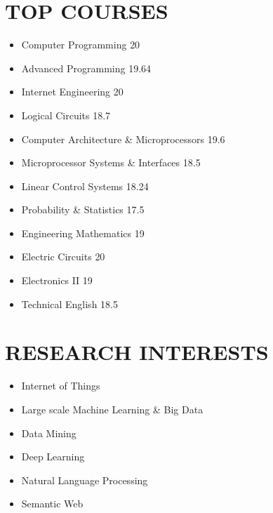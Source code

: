 \documentclass[10pt,a4paper,sans]{moderncv} %
\begin{document}
\section{TOP COURSES}

\begin{multicols}{2} 

	\begin{itemize}
	
		\item Computer Programming               		\hfill{20}  
		\item Advanced Programming                    \hfill{19.64}
		\item Internet Engineering						\hfill{20}
		\item Logical Circuits                         \hfill{18.7}
		\item Computer Architecture \& Microprocessors \hfill{19.6}
		\item Microprocessor Systems \& Interfaces		\hfill{18.5}
		\item Linear Control Systems                   \hfill{18.24}
		\item Probability \& Statistics				\hfill{17.5}  
		\item Engineering Mathematics               \hfill{19}
		\item Electric Circuits                       	  		\hfill{20}   
		\item Electronics II                              		\hfill{19} 
		\item Technical English                               \hfill{18.5}
	
	\end{itemize}

\end{multicols}

\section{RESEARCH INTERESTS}
\begin{itemize}
	\item Internet of Things
	\item Large scale Machine Learning \& Big Data
	\item Data Mining
	\item Deep Learning
	\item Natural Language Processing
	\item Semantic Web
\end{itemize}
\end{document}
